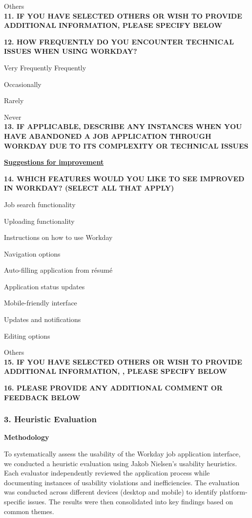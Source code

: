 \documentclass[
	letterpaper, %
]{jdf}
\begin{document}
\begin{sloppypar}
Others \\

\textbf{11. IF YOU HAVE SELECTED OTHERS OR WISH TO PROVIDE ADDITIONAL INFORMATION, PLEASE SPECIFY BELOW} 

\textbf{12. HOW FREQUENTLY DO YOU ENCOUNTER TECHNICAL ISSUES WHEN USING WORKDAY? 
}

Very Frequently
Frequently

Occasionally

Rarely

Never \\

\textbf{13. IF APPLICABLE, DESCRIBE ANY INSTANCES WHEN YOU HAVE ABANDONED A JOB APPLICATION THROUGH WORKDAY DUE TO ITS COMPLEXITY OR TECHNICAL ISSUES 
}

\underline{\textbf{Suggestions for improvement }}

\textbf{14. WHICH FEATURES WOULD YOU LIKE TO SEE IMPROVED IN WORKDAY? (SELECT ALL THAT APPLY)
}

Job search functionality

Uploading functionality

Instructions on how to use Workday

Navigation options

Auto-filling application from résumé  

Application status updates 

Mobile-friendly interface

Updates and notifications

Editing options 

Others \\

\textbf{15. IF YOU HAVE SELECTED OTHERS OR WISH TO PROVIDE ADDITIONAL INFORMATION, , PLEASE SPECIFY BELOW}

\textbf{16. PLEASE PROVIDE ANY ADDITIONAL COMMENT OR FEEDBACK BELOW	
}
\hfill \break
\hfill \break
\subsubsection{3. Heuristic Evaluation}

\textbf{Methodology}  

To systematically assess the usability of the Workday job application interface, we conducted a heuristic evaluation using Jakob Nielsen’s usability heuristics. Each evaluator independently reviewed the application process while documenting instances of usability violations and inefficiencies. The evaluation was conducted across different devices (desktop and mobile) to identify platform-specific issues. The results were then consolidated into key findings based on common themes.  


\end{sloppypar}
\end{document}
